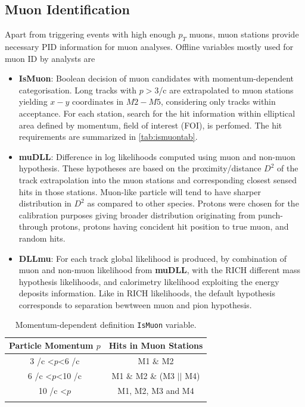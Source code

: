 \subsection{Muon Identification}
Apart from triggering events with high enough $p_{T}$ muons, muon stations provide necessary PID information for muon analyses. Offline variables mostly used for muon ID by analysts are
\begin{itemize}
	\item{\textbf{IsMuon}: Boolean decision of muon candidates with momentum-dependent categorisation. Long tracks with $p>3$\gev/c are extrapolated to muon stations yielding $x-y$ coordinates in $M2-M5$, considering only tracks within acceptance. For each station, search for the hit information within elliptical area defined by momentum, field of interest (\Gls{FOI}), is perfomed. The hit requirements are summarized in \autoref{tab:ismuontab}.}
	\item{\textbf{muDLL}: Difference in log likelihoods computed using muon and non-muon hypothesis. These hypotheses are based on the proximity/distance $D^{2}$ of the track extrapolation into the muon stations and corresponding closest sensed hits in those stations. Muon-like particle will tend to have sharper distribution in $D^{2}$ as compared to other species. Protons were chosen for the calibration purposes giving broader distribution originating from punch-through protons, protons having concident hit position to true muon, and random hits.}
	\item{\textbf{DLLmu}}:  For each track global likelihood is produced, by combination of muon and non-muon likelihood from \textbf{muDLL}, with the \Gls{RICH} different mass hypothesis likelihoods, and calorimetry likelihood exploiting the energy deposits information. Like in \Gls{RICH} likelihoods, the default hypothesis corresponds to separation bewtween muon and pion hypothesis.    

\end{itemize}


\begin{table}[!h]
	\centering
	\hspace*{-0.8cm}
	\begin{tabular}{c c}
		\hline
		Particle Momentum $p$  & Hits in Muon Stations \\ \hline
		3 \gev/c <$p$<6 \gev/c & M1 $\&$ M2\\
		6 \gev/c <$p$<10 \gev/c & M1 $\&$ M2 $\&$ (M3 $||$ M4) \\
		10 \gev/c <$p$ & M1, M2, M3 and M4 \\ \\\hline      
	\end{tabular}
	\caption{Momentum-dependent definition \texttt{IsMuon} variable.}
	\label{tab:ismuontab}
\end{table}   




